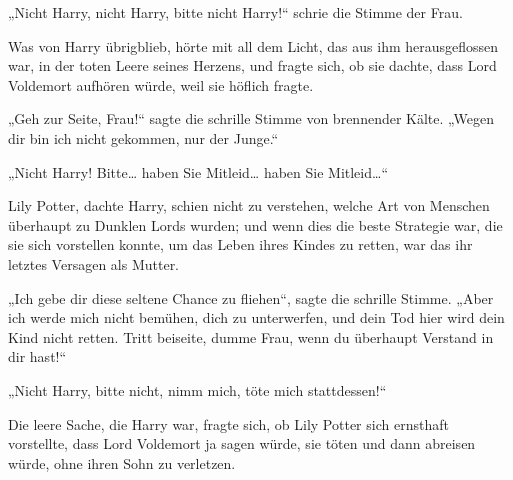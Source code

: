 \begin{em}
„Nicht Harry, nicht Harry, bitte nicht Harry!“ schrie die Stimme der Frau.

Was von Harry übrigblieb, hörte mit all dem Licht, das aus ihm herausgeflossen war, in der toten Leere seines Herzens, und fragte sich, ob sie dachte, dass Lord Voldemort aufhören würde, weil sie höflich fragte.

„Geh zur Seite, Frau!“ sagte die schrille Stimme von brennender Kälte. „Wegen dir bin ich nicht gekommen, nur der Junge.“

„Nicht Harry! Bitte… haben Sie Mitleid… haben Sie Mitleid…“

Lily Potter, dachte Harry, schien nicht zu verstehen, welche Art von Menschen überhaupt zu Dunklen Lords wurden; und wenn dies die beste Strategie war, die sie sich vorstellen konnte, um das Leben ihres Kindes zu retten, war das ihr letztes Versagen als Mutter.

„Ich gebe dir diese seltene Chance zu fliehen“, sagte die schrille Stimme. „Aber ich werde mich nicht bemühen, dich zu unterwerfen, und dein Tod hier wird dein Kind nicht retten. Tritt beiseite, dumme Frau, wenn du überhaupt Verstand in dir hast!“

„Nicht Harry, bitte nicht, nimm mich, töte mich stattdessen!“

Die leere Sache, die Harry war, fragte sich, ob Lily Potter sich ernsthaft vorstellte, dass Lord Voldemort ja sagen würde, sie töten und dann abreisen würde, ohne ihren Sohn zu verletzen.


\end{em}
